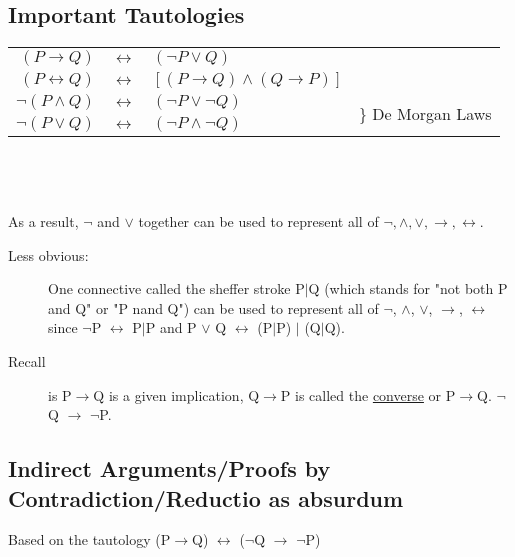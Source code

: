 \documentclass[10pt]{article}
\begin{document}
	\subsection{Important Tautologies}
	\begin{tabular}{rcll}
		$(P \rightarrow Q)$ & $\leftrightarrow$ & $(\lnot P \lor Q)$ \\
		$(P \leftrightarrow Q)$ & $\leftrightarrow$ & $[(P \rightarrow Q) \land (Q \rightarrow P)]$ \\
		$\lnot(P \land Q)$ & $\leftrightarrow$ & $(\lnot P \lor \lnot Q)$ & \multirow{2}{4cm}{\LARGE\} \normalsize De Morgan Laws} \\
		$\lnot(P \lor Q)$ & $\leftrightarrow$ & $(\lnot P \land \lnot Q)$ \\
	\end{tabular}
	~\\~\\~\\
	As a result, $\lnot$ and $\lor$ together can be used to represent all of $\lnot, \land, \lor, \rightarrow, \leftrightarrow$.
	
	\begin{description}
		\item[Less obvious:] One connective called the sheffer stroke P$\mid$Q (which stands for "not both P and Q" or "P nand Q") can be used to represent all of $\lnot$, $\land$, $\lor$, $\rightarrow$, $\leftrightarrow$ since $\lnot$P $\leftrightarrow$ P$\mid$P and P $\lor$ Q $\leftrightarrow$ (P$\mid$P) $\mid$ (Q$\mid$Q).
		\item[Recall] is P$\rightarrow$Q is a given implication, Q$\rightarrow$P is called the \underline{converse} or P$\rightarrow$Q. $\lnot$Q $\rightarrow$ $\lnot$P.
	\end{description}
	
	\subsection{Indirect Arguments/Proofs by Contradiction/Reductio as absurdum}
	Based on the tautology (P$\rightarrow$Q) $\leftrightarrow$ ($\lnot$Q $\rightarrow$ $\lnot$P)
	
\end{document}
